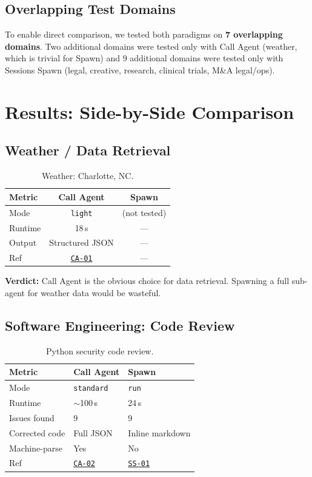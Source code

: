 \documentclass[11pt,twocolumn]{article}
\newcommand{\win}[1]{\cellcolor{winner}#1}
\newcommand{\lose}[1]{\cellcolor{loser}#1}
\newcommand{\tie}[1]{\cellcolor{tied}#1}
\newcommand{\ghbase}{https://github.com/agenticmail/agenticmail/blob/main/research/agent-rpc-vs-spawn}
\begin{document}
\subsection{Overlapping Test Domains}

To enable direct comparison, we tested both paradigms on \textbf{7 overlapping domains}. Two additional domains were tested only with Call Agent (weather, which is trivial for Spawn) and 9 additional domains were tested only with Sessions Spawn (legal, creative, research, clinical trials, M\&A legal/ops).

\section{Results: Side-by-Side Comparison}

\subsection{Weather / Data Retrieval}

\begin{table}[H]
\centering
\caption{Weather: Charlotte, NC.}
\begin{tabular}{@{}p{2.2cm}cc@{}}
\toprule
\textbf{Metric} & \textbf{Call Agent} & \textbf{Spawn} \\
\midrule
Mode & \texttt{light} & (not tested) \\
Runtime & \win{18\,s} & --- \\
Output & \win{Structured JSON} & --- \\
Ref & \href{\ghbase/results-callagent/01-weather-light.md}{\texttt{CA-01}} & --- \\
\bottomrule
\end{tabular}
\end{table}

\textbf{Verdict:} Call Agent is the obvious choice for data retrieval. Spawning a full sub-agent for weather data would be wasteful.

\subsection{Software Engineering: Code Review}

\begin{table}[H]
\centering
\caption{Python security code review.}
\begin{tabular}{@{}p{2.2cm}p{2.1cm}p{2.1cm}@{}}
\toprule
\textbf{Metric} & \textbf{Call Agent} & \textbf{Spawn} \\
\midrule
Mode & \texttt{standard} & \texttt{run} \\
Runtime & \lose{$\sim$100\,s} & \win{24\,s} \\
Issues found & \tie{9} & \tie{9} \\
Corrected code & \win{Full JSON} & Inline markdown \\
Machine-parse & \win{Yes} & \lose{No} \\
Ref & \href{\ghbase/results-callagent/02-code-review-standard.md}{\texttt{CA-02}} & \href{\ghbase/results/01-code-review.md}{\texttt{SS-01}} \\
\bottomrule
\end{tabular}
\end{table}
\end{document}
